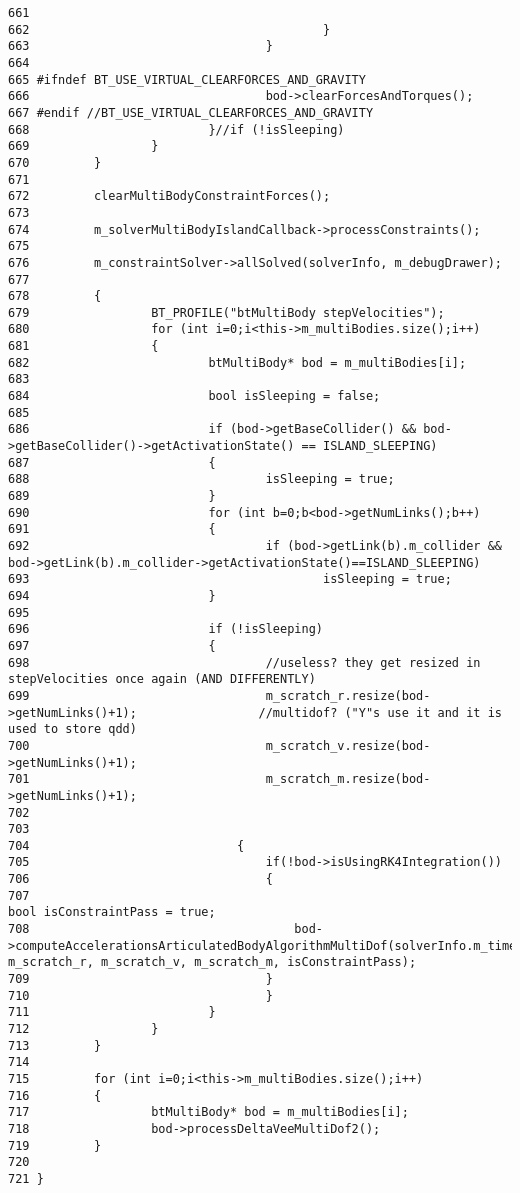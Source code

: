 \begin{Code}
\begin{verbatim}
661                                                 
662                                         }
663                                 }
664                                 
665 #ifndef BT_USE_VIRTUAL_CLEARFORCES_AND_GRAVITY
666                                 bod->clearForcesAndTorques();
667 #endif //BT_USE_VIRTUAL_CLEARFORCES_AND_GRAVITY
668                         }//if (!isSleeping)
669                 }
670         }
671 
672         clearMultiBodyConstraintForces();
673 
674         m_solverMultiBodyIslandCallback->processConstraints();
675         
676         m_constraintSolver->allSolved(solverInfo, m_debugDrawer);
677 
678         {
679                 BT_PROFILE("btMultiBody stepVelocities");
680                 for (int i=0;i<this->m_multiBodies.size();i++)
681                 {
682                         btMultiBody* bod = m_multiBodies[i];
683 
684                         bool isSleeping = false;
685 
686                         if (bod->getBaseCollider() && bod->getBaseCollider()->getActivationState() == ISLAND_SLEEPING)
687                         {
688                                 isSleeping = true;
689                         }
690                         for (int b=0;b<bod->getNumLinks();b++)
691                         {
692                                 if (bod->getLink(b).m_collider && bod->getLink(b).m_collider->getActivationState()==ISLAND_SLEEPING)
693                                         isSleeping = true;
694                         }
695 
696                         if (!isSleeping)
697                         {
698                                 //useless? they get resized in stepVelocities once again (AND DIFFERENTLY)
699                                 m_scratch_r.resize(bod->getNumLinks()+1);                 //multidof? ("Y"s use it and it is used to store qdd)
700                                 m_scratch_v.resize(bod->getNumLinks()+1);
701                                 m_scratch_m.resize(bod->getNumLinks()+1);
702 
703                                 
704                             {
705                                 if(!bod->isUsingRK4Integration())
706                                 {
707                                                                         bool isConstraintPass = true;
708                                     bod->computeAccelerationsArticulatedBodyAlgorithmMultiDof(solverInfo.m_timeStep, m_scratch_r, m_scratch_v, m_scratch_m, isConstraintPass);
709                                 }
710                                 }
711                         }
712                 }
713         }
714 
715         for (int i=0;i<this->m_multiBodies.size();i++)
716         {
717                 btMultiBody* bod = m_multiBodies[i];
718                 bod->processDeltaVeeMultiDof2();
719         }
720 
721 }
\end{verbatim}
\end{Code}





